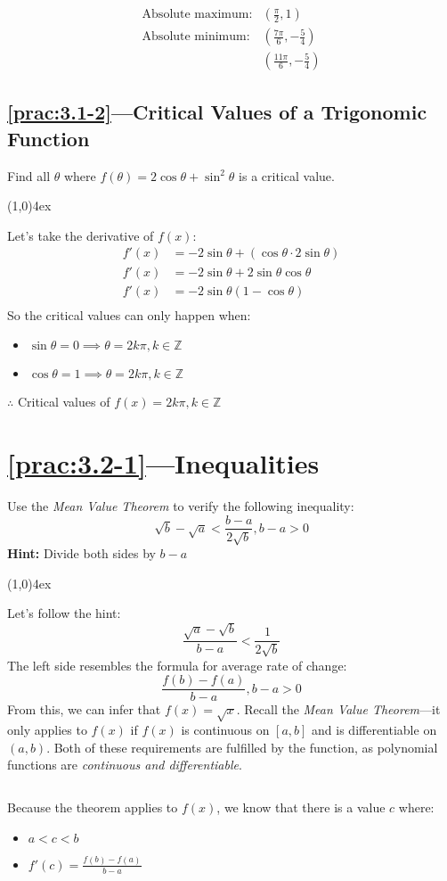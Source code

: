 \documentclass{MathNotes}
\newcommand{\br}{
	\begin{center}
		\line(1,0){4ex}
	\end{center}}
\newcommand{\bl}{
	\newline$ $\newline
}
\begin{document}
\begin{align*}
	\text{Absolute maximum:} & (\frac{\pi}{2}, 1)              \\
	\text{Absolute minimum:} & (\frac{7\pi}{6}, -\frac{5}{4})  \\
	                         & (\frac{11\pi}{6}, -\frac{5}{4})
\end{align*}

\subsection*{\ref{prac:3.1-2}---Critical Values of a Trigonomic Function}
\label{ans:3.1-2}
Find all $\theta$ where $\displaystyle f(\theta)=2\cos\theta+\sin^2\theta$
is a critical value.
\br
Let's take the derivative of $f(x)$:
\begin{align*}
	f'(x) & =-2\sin\theta+(\cos\theta\cdot 2\sin\theta) \\
	f'(x) & =-2\sin\theta+2\sin\theta\cos\theta         \\
	f'(x) & =-2\sin\theta(1 - \cos\theta)               \\
\end{align*}
So the critical values can only happen when:
\begin{multicols}{2}
	\begin{itemize}
		\item $\sin\theta=0\implies\theta=2k\pi,k\in\mathbb{Z}$
		\item $\cos\theta=1\implies\theta=2k\pi,k\in\mathbb{Z}$
	\end{itemize}
\end{multicols}
$\therefore$ Critical values of $f(x)=2k\pi,k\in\mathbb{Z}$

\newpage
\section*{\ref{prac:3.2-1}---Inequalities}\label{ans:3.2-1}
Use the \textit{Mean Value Theorem} to verify the following inequality:
$$\sqrt{b}-\sqrt{a}<\frac{b-a}{2\sqrt{b}},b-a>0$$
\textbf{Hint:} Divide both sides by $b-a$
\br
Let's follow the hint:$$\frac{\sqrt{a}-\sqrt{b}}{b-a}<\frac{1}{2\sqrt{b}}$$
The left side resembles the formula for average rate of change:
$$\frac{f(b)-f(a)}{b-a},b-a>0$$
From this, we can infer that $f(x)=\sqrt{x}$. Recall the \textit{Mean Value
	Theorem}---it only applies to $f(x)$ if $f(x)$ is continuous on $[a, b]$ and
is differentiable on $(a, b)$. Both of these requirements are fulfilled by the
function, as polynomial functions are \textit{continuous and differentiable}.
\bl
Because the theorem applies to $f(x)$, we know that there is a value $c$ where:
\begin{multicols}{2}
	\begin{itemize}
		\item $a<c<b$
		\item $f'(c)=\frac{f(b)-f(a)}{b-a}$
	\end{itemize}
\end{multicols}
\end{document}
